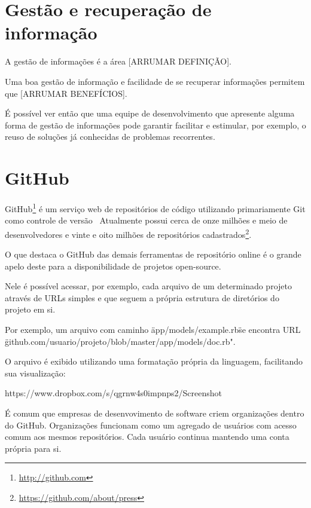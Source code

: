 \section{Gestão e recuperação de informação}

A gestão de informações é a área [ARRUMAR DEFINIÇÃO].

Uma boa gestão de informação e facilidade de se recuperar informações permitem que [ARRUMAR BENEFÍCIOS].

É possível ver então que uma equipe de desenvolvimento que apresente alguma forma de gestão de informações pode garantir facilitar e estimular, por exemplo, o reuso de soluções já conhecidas de problemas recorrentes.

\section{GitHub}

GitHub\footnote{\url{http://github.com}} é um serviço web de repositórios de código utilizando primariamente Git como controle de versão~\cite{Figueira2015} Atualmente possui cerca de onze milhões e meio de desenvolvedores e vinte e oito milhões de repositórios cadastrados\footnote{\url{https://github.com/about/press}}.

O que destaca o GitHub das demais ferramentas de repositório online é o grande apelo deste para a disponibilidade de projetos open-source.

Nele é possível acessar, por exemplo, cada arquivo de um determinado projeto através de URLs simples e que seguem a própria estrutura de diretórios do projeto em si.

Por exemplo, um arquivo com caminho \"app/models/example.rb\" se encontra URL \"github.com/usuario/projeto/blob/master/app/models/doc.rb".

O arquivo é exibido utilizando uma formatação própria da linguagem, facilitando sua visualização:

https://www.dropbox.com/s/qgrnw4s0impnps2/Screenshot%

É comum que empresas de desenvovimento de software criem organizações dentro do GitHub. Organizações funcionam como um agregado de usuários com acesso comum aos mesmos repositórios. Cada usuário continua mantendo uma conta própria para si.

